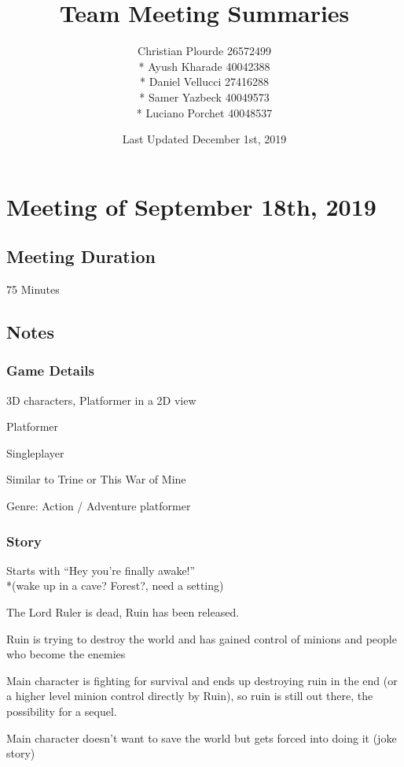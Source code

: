 \documentclass{article}
\begin{document}
\title{Team Meeting Summaries}
\author{Christian Plourde 26572499\\*
		Ayush Kharade 40042388\\*
		Daniel Vellucci 27416288\\*
		Samer Yazbeck 40049573\\*
		Luciano Porchet 40048537
		}
\date{Last Updated December 1st, 2019}

\maketitle

\newpage

\section{Meeting of September 18th, 2019}

\subsection{Meeting Duration}
75 Minutes

\subsection{Notes}
\subsubsection{Game Details}
\begin{description}
\item 3D characters, Platformer in a 2D view
\item Platformer
\item Singleplayer
\item Similar to Trine or This War of Mine
\item Genre: Action / Adventure platformer
\end{description}

\subsubsection{Story}
\begin{description}
\item Starts with “Hey you're finally awake!”\\*(wake up in a cave? Forest?, need a setting)
\item The Lord Ruler is dead, Ruin has been released.
\item Ruin is trying to destroy the world and has gained control of minions and people who become the enemies
\item Main character is fighting for survival and ends up destroying ruin in the end (or a higher level minion control directly by Ruin), so ruin is still out there, the possibility for a sequel.
\item Main character doesn't want to save the world but gets forced into doing it (joke story) 
\end{description}
\end{document}
